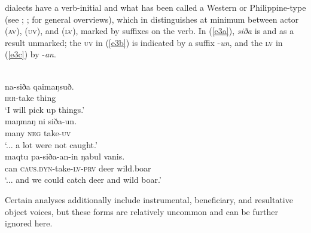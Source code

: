 \documentclass[output=paper
,modfonts
,nonflat]{langsci/langscibook}
\begin{document}
 dialects have a verb-initial  and what has been called a Western  or Philippine-type  (see \citealt{French1987}; \citealt{Foley2007voice}; \citealt{Riesberg2014} for general overviews), which in  distinguishes at minimum between actor (\textsc{av}),  (\textsc{uv}), and  (\textsc{lv}), marked by suffixes on the verb. In (\ref{e3a}), \textit{siða} is  and as a result unmarked; the \textsc{uv} in (\ref{e3b}) is indicated by a suffix -\textit{un}, and the \textsc{lv} in (\ref{e3c}) by -\textit{an}. 

\begin{exe}
	\label{e3}
	\begin{xlist}
		\ex\label{e3a}  \\
		\gll na-siða  qaimaŋsuð.\\
		\textsc{irr}-take  thing\\
		\glt `I will pick up things.’
		\ex\label{e3b}  \\
		\gll maŋmaŋ  ni  siða-un.  \\
		many  \textsc{neg}  take-\textsc{uv}\\
		\glt `... a lot were not caught.’
		\ex\label{e3c}  \\
		\gll maqtu  pa-siða-an-in  ŋabul  vanis.\\
		can  \textsc{caus}.\textsc{dyn}-take-\textsc{lv}-\textsc{prv}  deer  wild.boar\\
		\glt `... and we could catch deer and wild boar.’
	\end{xlist}
\end{exe}

\noindent
Certain analyses additionally include instrumental, beneficiary, and resultative object voices, but these forms are relatively uncommon and can be further ignored here.
\end{document}
